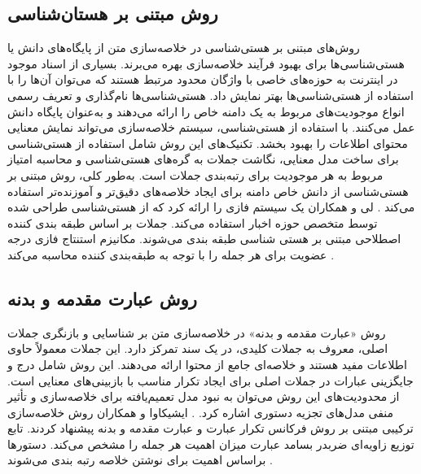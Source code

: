 \subsection{روش مبتنی بر هستان‌شناسی}
روش‌های مبتنی بر هستی‌شناسی در خلاصه‌سازی متن از پایگاه‌های دانش یا هستی‌شناسی‌ها برای بهبود فرآیند خلاصه‌سازی بهره می‌برند. بسیاری از اسناد موجود در اینترنت به حوزه‌های خاصی با واژگان محدود مرتبط هستند که می‌توان آن‌ها را با استفاده از هستی‌شناسی‌ها بهتر نمایش داد. هستی‌شناسی‌ها نام‌گذاری و تعریف رسمی انواع موجودیت‌های مربوط به یک دامنه خاص را ارائه می‌دهند و به‌عنوان پایگاه دانش عمل می‌کنند. با استفاده از هستی‌شناسی، سیستم خلاصه‌سازی می‌تواند نمایش معنایی محتوای اطلاعات را بهبود بخشد. تکنیک‌های این روش شامل استفاده از هستی‌شناسی برای ساخت مدل معنایی، نگاشت جملات به گره‌های هستی‌شناسی و محاسبه امتیاز مربوط به هر موجودیت برای رتبه‌بندی جملات است. به‌طور کلی، روش مبتنی بر هستی‌شناسی از دانش خاص دامنه برای ایجاد خلاصه‌های دقیق‌تر و آموزنده‌تر استفاده می‌کند
\cite{andhale2016overview}.
لی و همکاران  یک سیستم فازی را ارائه کرد که از هستی‌شناسی طراحی شده توسط متخصص حوزه اخبار استفاده می‌کند. جملات بر اساس طبقه بندی کننده اصطلاحی مبتنی بر هستی شناسی طبقه بندی می‌شوند. مکانیزم استنتاج فازی درجه عضویت برای هر جمله را با توجه به طبقه‌بندی کننده محاسبه می‌کند
\cite{lee2005fuzzy}.

\subsection{روش  عبارت مقدمه و بدنه}

روش «عبارت مقدمه و بدنه» در خلاصه‌سازی متن بر شناسایی و بازنگری جملات اصلی، معروف به جملات کلیدی، در یک سند تمرکز دارد. این جملات معمولاً حاوی اطلاعات مفید هستند و خلاصه‌ای جامع از محتوا ارائه می‌دهند. این روش شامل درج و جایگزینی عبارات در جملات اصلی برای ایجاد تکرار مناسب با بازبینی‌های معنایی است. از محدودیت‌های این روش می‌توان به نبود مدل تعمیم‌یافته برای خلاصه‌سازی و تأثیر منفی مدل‌های تجزیه دستوری اشاره کرد.
\cite{andhale2016overview}.
ایشیکاوا و همکاران  روش خلاصه‌سازی ترکیبی مبتنی بر روش فرکانس تکرار عبارت
و عبارت مقدمه و بدنه پیشنهاد کردند. تابع توزیع زاویه‌ای ضربدر بسامد عبارت  میزان اهمیت هر جمله را مشخص می‌کند. دستورها براساس اهمیت برای نوشتن خلاصه رتبه بندی می‌شوند
\cite{Ishikawa2001HybridTS}.

